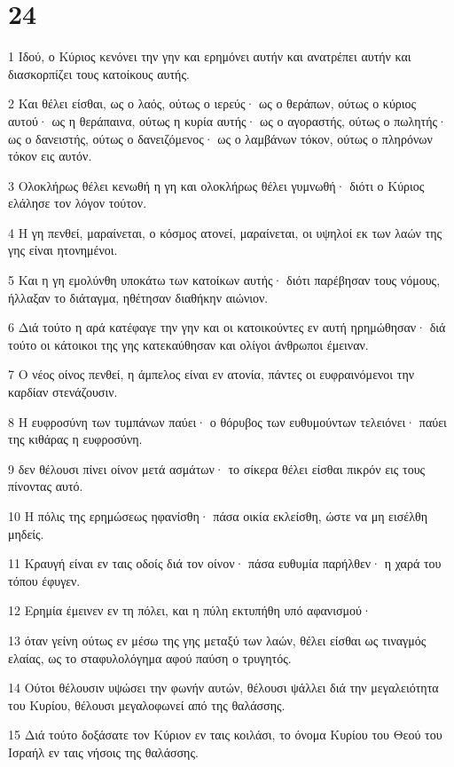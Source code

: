 \chapter{24}

\par 1 Ιδού, ο Κύριος κενόνει την γην και ερημόνει αυτήν και ανατρέπει αυτήν και διασκορπίζει τους κατοίκους αυτής.
\par 2 Και θέλει είσθαι, ως ο λαός, ούτως ο ιερεύς· ως ο θεράπων, ούτως ο κύριος αυτού· ως η θεράπαινα, ούτως η κυρία αυτής· ως ο αγοραστής, ούτως ο πωλητής· ως ο δανειστής, ούτως ο δανειζόμενος· ως ο λαμβάνων τόκον, ούτως ο πληρόνων τόκον εις αυτόν.
\par 3 Ολοκλήρως θέλει κενωθή η γη και ολοκλήρως θέλει γυμνωθή· διότι ο Κύριος ελάλησε τον λόγον τούτον.
\par 4 Η γη πενθεί, μαραίνεται, ο κόσμος ατονεί, μαραίνεται, οι υψηλοί εκ των λαών της γης είναι ητονημένοι.
\par 5 Και η γη εμολύνθη υποκάτω των κατοίκων αυτής· διότι παρέβησαν τους νόμους, ήλλαξαν το διάταγμα, ηθέτησαν διαθήκην αιώνιον.
\par 6 Διά τούτο η αρά κατέφαγε την γην και οι κατοικούντες εν αυτή ηρημώθησαν· διά τούτο οι κάτοικοι της γης κατεκαύθησαν και ολίγοι άνθρωποι έμειναν.
\par 7 Ο νέος οίνος πενθεί, η άμπελος είναι εν ατονία, πάντες οι ευφραινόμενοι την καρδίαν στενάζουσιν.
\par 8 Η ευφροσύνη των τυμπάνων παύει· ο θόρυβος των ευθυμούντων τελειόνει· παύει της κιθάρας η ευφροσύνη.
\par 9 δεν θέλουσι πίνει οίνον μετά ασμάτων· το σίκερα θέλει είσθαι πικρόν εις τους πίνοντας αυτό.
\par 10 Η πόλις της ερημώσεως ηφανίσθη· πάσα οικία εκλείσθη, ώστε να μη εισέλθη μηδείς.
\par 11 Κραυγή είναι εν ταις οδοίς διά τον οίνον· πάσα ευθυμία παρήλθεν· η χαρά του τόπου έφυγεν.
\par 12 Ερημία έμεινεν εν τη πόλει, και η πύλη εκτυπήθη υπό αφανισμού·
\par 13 όταν γείνη ούτως εν μέσω της γης μεταξύ των λαών, θέλει είσθαι ως τιναγμός ελαίας, ως το σταφυλολόγημα αφού παύση ο τρυγητός.
\par 14 Ούτοι θέλουσιν υψώσει την φωνήν αυτών, θέλουσι ψάλλει διά την μεγαλειότητα του Κυρίου, θέλουσι μεγαλοφωνεί από της θαλάσσης.
\par 15 Διά τούτο δοξάσατε τον Κύριον εν ταις κοιλάσι, το όνομα Κυρίου του Θεού του Ισραήλ εν ταις νήσοις της θαλάσσης.
